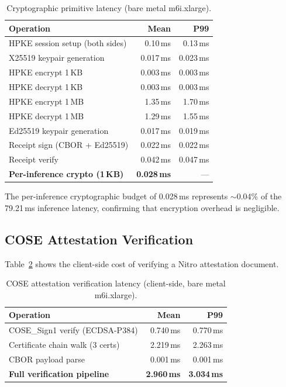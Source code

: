 \documentclass[11pt,a4paper]{article}
\newcommand{\BenchBareMeanMs}{79.21}
\begin{document}
\begin{table}[ht]
\centering
\caption{Cryptographic primitive latency (bare metal m6i.xlarge).}
\label{tab:crypto}
\begin{tabular}{lrr}
\hline
\textbf{Operation} & \textbf{Mean} & \textbf{P99} \\
\hline
HPKE session setup (both sides) & 0.10\,ms & 0.13\,ms \\
X25519 keypair generation       & 0.017\,ms & 0.023\,ms \\
HPKE encrypt 1\,KB              & 0.003\,ms & 0.003\,ms \\
HPKE decrypt 1\,KB              & 0.003\,ms & 0.003\,ms \\
HPKE encrypt 1\,MB              & 1.35\,ms  & 1.70\,ms \\
HPKE decrypt 1\,MB              & 1.29\,ms  & 1.55\,ms \\
Ed25519 keypair generation      & 0.017\,ms & 0.019\,ms \\
Receipt sign (CBOR + Ed25519)   & 0.022\,ms & 0.022\,ms \\
Receipt verify                  & 0.042\,ms & 0.047\,ms \\
\hline
\textbf{Per-inference crypto (1\,KB)} & \textbf{0.028\,ms} & --- \\
\hline
\end{tabular}
\end{table}

The per-inference cryptographic budget of 0.028\,ms represents $\sim$0.04\% of the \BenchBareMeanMs{}\,ms inference latency, confirming that encryption overhead is negligible.

\subsection{COSE Attestation Verification}

Table~\ref{tab:cose} shows the client-side cost of verifying a Nitro attestation document.

\begin{table}[ht]
\centering
\caption{COSE attestation verification latency (client-side, bare metal m6i.xlarge).}
\label{tab:cose}
\begin{tabular}{lrr}
\hline
\textbf{Operation} & \textbf{Mean} & \textbf{P99} \\
\hline
COSE\_Sign1 verify (ECDSA-P384) & 0.740\,ms & 0.770\,ms \\
Certificate chain walk (3 certs) & 2.219\,ms & 2.263\,ms \\
CBOR payload parse               & 0.001\,ms & 0.001\,ms \\
\hline
\textbf{Full verification pipeline} & \textbf{2.960\,ms} & \textbf{3.034\,ms} \\
\hline
\end{tabular}
\end{table}
\end{document}
